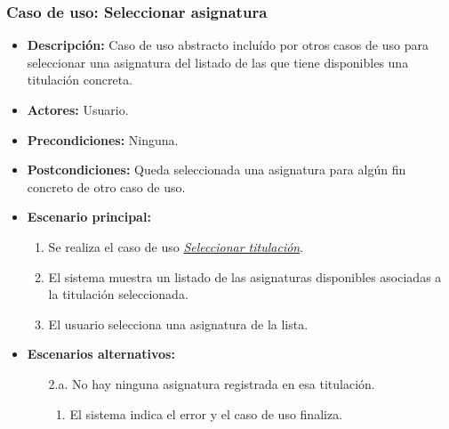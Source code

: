 \subsubsection*{Caso de uso: Seleccionar asignatura}
\label{select_asignatura}
\begin{itemize}
\item{\bf Descripción:} Caso de uso abstracto incluído por otros casos de uso para seleccionar una asignatura del listado de las que tiene disponibles una titulación concreta.
\item{\bf Actores:} Usuario.
\item{\bf Precondiciones:} Ninguna.
\item{\bf Postcondiciones:} Queda seleccionada una asignatura para algún fin concreto de otro caso de uso.
\item{\bf Escenario principal:}
	\begin{enumerate}
	\item Se realiza el caso de uso {\em\hyperref[select_titulacion]{Seleccionar titulación}}.
	\item El sistema muestra un listado de las asignaturas disponibles asociadas a la titulación seleccionada.
	\item El usuario selecciona una asignatura de la lista.
	\end{enumerate}
\item{\bf Escenarios alternativos:}
	\begin{itemize}
		\item[2.a.] No hay ninguna asignatura registrada en esa titulación.
		\begin{enumerate}
			\item El sistema indica el error y el caso de uso finaliza.
		\end{enumerate}
	\end{itemize}
\end{itemize}




